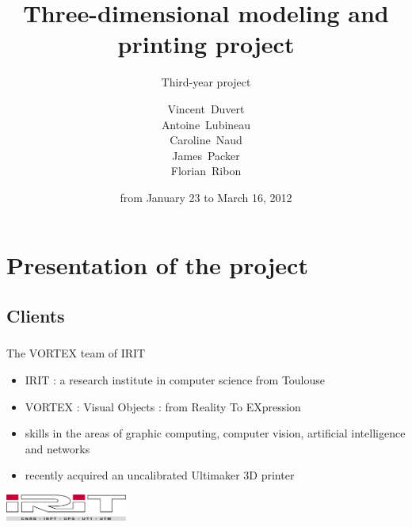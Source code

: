 \documentclass{beamer}
\title{Three-dimensional modeling and printing project}
\subtitle{Third-year project}
\author[V. Duvert, A. Lubineau, C. Naud, J. Packer, F. Ribon]{\scriptsize
Vincent~Duvert \\ Antoine~Lubineau \\ Caroline~Naud \\ James~Packer \\ Florian~Ribon}
\date{from January 23 to March 16, 2012}
\begin{document}
\frame{\titlepage}

\section{Presentation of the project}

\subsection{Clients}
\begin{frame}
	\frametitle{}
	
	\begin{block}{The \textsc{VORTEX} team of IRIT}
		\begin{itemize}
		\item \textsc{IRIT} : a research institute in computer science from Toulouse
		\item \textsc{VORTEX} : Visual Objects : from Reality To EXpression
		\item skills in the areas of graphic computing,  computer vision, artificial intelligence and networks
		\item recently acquired an uncalibrated Ultimaker 3D printer
		\end{itemize}
    \end{block}
    
    \begin{center}
		\includegraphics[width=4cm]{irit}
	\end{center}
    
\end{frame}
\end{document}
